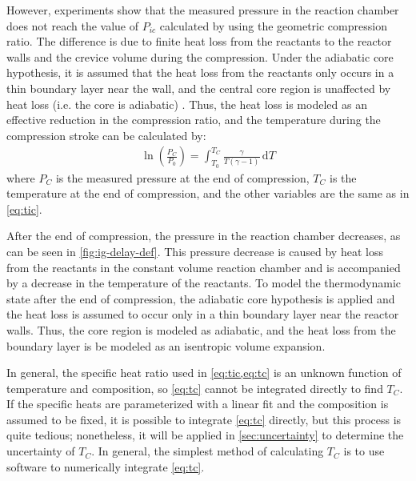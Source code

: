 \documentclass[../main.tex]{subfiles}
\begin{document}
However, experiments show that the measured pressure in the reaction chamber
does not reach the value of $P_{ic}$ calculated by using the geometric
compression ratio. The difference is due to finite heat loss from the
reactants to the reactor walls and the crevice volume during the
compression. Under the adiabatic core hypothesis, it is assumed that
the heat loss from the reactants only occurs in a thin boundary layer
near the wall, and the central core region is unaffected by heat loss
(i.e. the core is adiabatic) \cite{Desgroux1995}. Thus, the heat
loss is modeled as an effective reduction in the compression ratio, and
the temperature during the compression stroke can be calculated by:
%
\begin{align}
\ln\left(\frac{P_{C}}{P_0}\right) = \int_{T_0}^{T_{C}} \! \frac{\gamma}{T\left(\gamma-1\right)} \, \mathrm{d} T
\label{eq:tc}
\end{align}
%
where $P_C$ is the measured pressure at the end of compression, $T_C$
is the temperature at the end of compression, and the other variables
are the same as in \cref{eq:tic}.

After the end of compression, the pressure in the reaction chamber
decreases, as can be seen in \cref{fig:ig-delay-def}. This pressure
decrease is caused by heat loss from the reactants in the constant volume reaction
chamber and is accompanied by a decrease in the temperature of the
reactants. To model the thermodynamic state after the end of compression,
the adiabatic core hypothesis is applied and the heat loss is
assumed to occur only in a thin boundary layer near the reactor walls.
Thus, the core region is modeled as adiabatic, and the heat loss
from the boundary layer is be modeled as an isentropic volume
expansion.

In general, the specific heat ratio used in \cref{eq:tic,eq:tc} is an
unknown function of temperature and composition, so \cref{eq:tc}
cannot be integrated directly to find $T_C$. If the specific heats are
parameterized with a linear fit and the composition is assumed to be
fixed, it is possible to integrate \cref{eq:tc} directly, but this
process is quite tedious; nonetheless, it will be applied in
\cref{sec:uncertainty} to determine the uncertainty of $T_C$. In
general, the simplest method of calculating $T_C$ is to use software
to numerically integrate \cref{eq:tc}.
\end{document}
